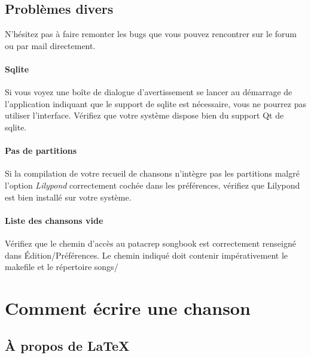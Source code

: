 \documentclass[a4paper]{article}
\begin{document}
\subsection{Problèmes divers}

N'hésitez pas à faire remonter les bugs que vous pouvez rencontrer sur
le forum ou par mail directement. 

\paragraph{Sqlite} Si vous voyez une boîte de dialogue
d'avertissement se lancer au démarrage de l'application indiquant que
le support de sqlite est nécessaire, vous ne pourrez pas utiliser
l'interface. Vérifiez que votre système dispose bien du support Qt de sqlite.

\paragraph{Pas de partitions}
Si la compilation de votre recueil de chansons n'intègre pas les
partitions malgré l'option \emph{Lilypond} correctement cochée dans les
préférences, vérifiez que Lilypond est bien installé sur votre système. 

\paragraph{Liste des chansons vide} Vérifiez que le chemin d'accès au
patacrep songbook est correctement renseigné dans Édition/Préférences.
Le chemin indiqué doit contenir impérativement le makefile et le
répertoire songs/


\section{Comment écrire une chanson}

\subsection{À propos de \LaTeX}
\end{document}
